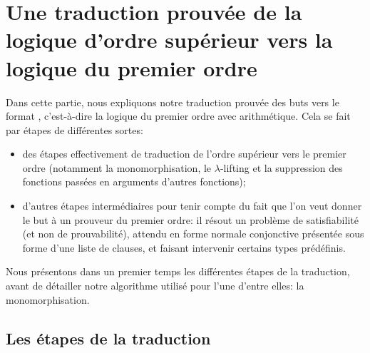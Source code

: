 \section{Une traduction prouvée de la logique d'ordre supérieur vers la
  logique du premier ordre}
\label{sec:traduction}

Dans cette partie, nous expliquons notre traduction prouvée des buts
\holfour vers le format \tff, c'est-à-dire la logique du premier ordre
avec arithmétique. Cela se fait par étapes de différentes sortes:
\begin{itemize}
\item des étapes effectivement de traduction de l'ordre supérieur vers
  le premier ordre (notamment la monomorphisation, le $\lambda$-lifting
  et la suppression des fonctions passées en arguments d'autres
  fonctions);
\item d'autres étapes intermédiaires pour tenir compte du fait que l'on
  veut donner le but à un prouveur du premier ordre: il résout un
  problème de satisfiabilité (et non de prouvabilité), attendu en forme
  normale conjonctive présentée sous forme d'une liste de clauses, et
  faisant intervenir certains types prédéfinis.
\end{itemize}
Nous présentons dans un premier temps les différentes étapes de la
traduction, avant de détailler notre algorithme utilisé pour l'une
d'entre elles: la monomorphisation.


\subsection{Les étapes de la traduction}


